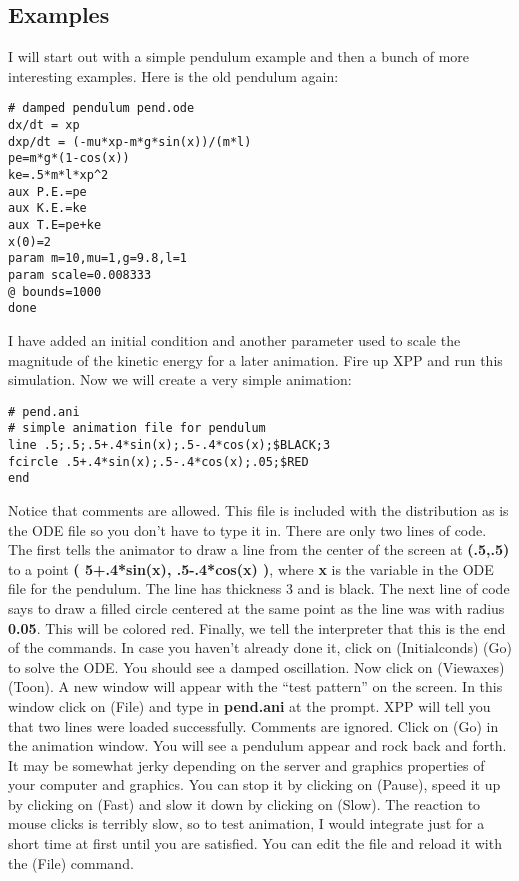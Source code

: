 \documentclass{article}
\begin{document}
\subsection{Examples}
I will start out with a simple pendulum example and then a bunch of
more interesting examples.
Here is the old pendulum again:
\begin{verbatim}
# damped pendulum pend.ode
dx/dt = xp
dxp/dt = (-mu*xp-m*g*sin(x))/(m*l)
pe=m*g*(1-cos(x))
ke=.5*m*l*xp^2
aux P.E.=pe
aux K.E.=ke
aux T.E=pe+ke
x(0)=2
param m=10,mu=1,g=9.8,l=1
param scale=0.008333
@ bounds=1000
done
\end{verbatim}
I have added an initial condition and another parameter used to scale
the magnitude of the kinetic energy for a later animation. Fire up XPP
and run this simulation. Now we will create a very simple animation:
\begin{verbatim}
# pend.ani
# simple animation file for pendulum
line .5;.5;.5+.4*sin(x);.5-.4*cos(x);$BLACK;3
fcircle .5+.4*sin(x);.5-.4*cos(x);.05;$RED
end
\end{verbatim}
Notice that comments are allowed. This file is included with the
distribution as is the ODE file so you don't have to type it in. There
are only two lines of code. The first tells the animator to draw a
line from the center of the screen at {\bf (.5,.5)} to a point {\bf
( 5+.4*sin(x), .5-.4*cos(x) )}, where {\bf x} is the variable in the
ODE file for the pendulum. The line has thickness 3 and is black. The
next line of code says to draw a filled circle centered at the same
point as the line was with radius {\bf 0.05}.  This will be colored
red.  Finally, we tell the interpreter that this is the end of the
commands.
In case you haven't already done it, click on (Initialconds)
(Go) to solve the ODE. You should see a damped oscillation. Now click
on (Viewaxes) (Toon). A new window will appear with the ``test
pattern'' on the screen. In this window click on (File) and type in
{\bf pend.ani} at the prompt. XPP will tell you that two lines were
loaded successfully. Comments are ignored. Click on (Go) in the
animation window. You will see a pendulum appear and rock back and
forth. It may be somewhat jerky depending on the server and graphics
properties of your computer and graphics. You can stop it by clicking
on (Pause), speed it up by clicking on (Fast) and slow it down by
clicking on (Slow).  The reaction to mouse clicks is terribly slow, so
to test animation, I would integrate just for a short time at first
until you are satisfied. You can edit the file and reload it with the
(File) command.
\end{document}
